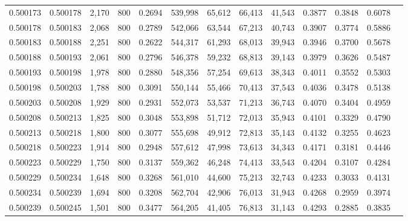 \begin{tabular}{rrrrrrrrrrrrr}
0.500173 & 0.500178 &  2,170 &   800 &                                     0.2694 & 539,998 &  65,612 &  66,413 &  41,543 & 0.3877 & 0.3848 & 0.6078 \\
0.500178 & 0.500183 &  2,068 &   800 &                                     0.2789 & 542,066 &  63,544 &  67,213 &  40,743 & 0.3907 & 0.3774 & 0.5886 \\
0.500183 & 0.500188 &  2,251 &   800 &                                     0.2622 & 544,317 &  61,293 &  68,013 &  39,943 & 0.3946 & 0.3700 & 0.5678 \\
0.500188 & 0.500193 &  2,061 &   800 &                                     0.2796 & 546,378 &  59,232 &  68,813 &  39,143 & 0.3979 & 0.3626 & 0.5487 \\
0.500193 & 0.500198 &  1,978 &   800 &                                     0.2880 & 548,356 &  57,254 &  69,613 &  38,343 & 0.4011 & 0.3552 & 0.5303 \\
0.500198 & 0.500203 &  1,788 &   800 &                                     0.3091 & 550,144 &  55,466 &  70,413 &  37,543 & 0.4036 & 0.3478 & 0.5138 \\
0.500203 & 0.500208 &  1,929 &   800 &                                     0.2931 & 552,073 &  53,537 &  71,213 &  36,743 & 0.4070 & 0.3404 & 0.4959 \\
0.500208 & 0.500213 &  1,825 &   800 &                                     0.3048 & 553,898 &  51,712 &  72,013 &  35,943 & 0.4101 & 0.3329 & 0.4790 \\
0.500213 & 0.500218 &  1,800 &   800 &                                     0.3077 & 555,698 &  49,912 &  72,813 &  35,143 & 0.4132 & 0.3255 & 0.4623 \\
0.500218 & 0.500223 &  1,914 &   800 &                                     0.2948 & 557,612 &  47,998 &  73,613 &  34,343 & 0.4171 & 0.3181 & 0.4446 \\
0.500223 & 0.500229 &  1,750 &   800 &                                     0.3137 & 559,362 &  46,248 &  74,413 &  33,543 & 0.4204 & 0.3107 & 0.4284 \\
0.500229 & 0.500234 &  1,648 &   800 &                                     0.3268 & 561,010 &  44,600 &  75,213 &  32,743 & 0.4233 & 0.3033 & 0.4131 \\
0.500234 & 0.500239 &  1,694 &   800 &                                     0.3208 & 562,704 &  42,906 &  76,013 &  31,943 & 0.4268 & 0.2959 & 0.3974 \\
0.500239 & 0.500245 &  1,501 &   800 &                                     0.3477 & 564,205 &  41,405 &  76,813 &  31,143 & 0.4293 & 0.2885 & 0.3835 \\

\end{tabular}
